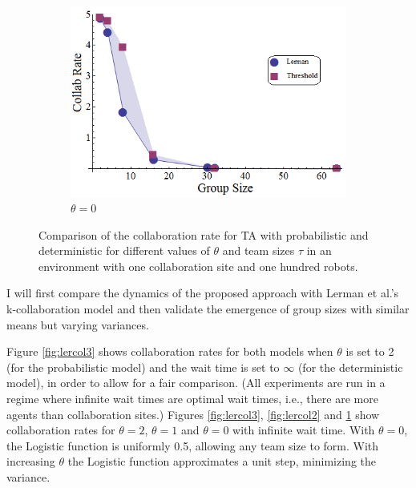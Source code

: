 \documentclass[defaultstyle,12pt]{thesis}
\begin{document}
\begin{figure}[!htb]
\begin{subfigure}{0.33\textwidth}
\centering\includegraphics[width=1.0\textwidth]{../assets/LermanCollabCompare1.png}
\centering\caption{$\theta=0$}\label{fig:lercol1}
\end{subfigure}
\caption{Comparison of the collaboration rate for TA with probabilistic and deterministic \cite{Lerman2001} for different values of $\theta$ and team sizes $\tau$ in an environment with one collaboration site and one hundred robots. }\label{fig:lercol}
\end{figure}

I will first compare the dynamics of the proposed approach with Lerman et al.'s k-collaboration model \cite{Lerman2001} and then validate the emergence of group sizes with similar means but varying variances.

Figure \ref{fig:lercol3} shows collaboration rates for both models when $\theta$ is set to 2 (for the probabilistic model) and the wait time is set to $\infty$ (for the deterministic model), in order to allow for a fair comparison. (All experiments are run in a regime where infinite wait times are optimal wait times, i.e., there are more agents than collaboration sites.) Figures \ref{fig:lercol3}, \ref{fig:lercol2} and \ref{fig:lercol1} show collaboration rates for $\theta = 2$, $\theta = 1$ and $\theta=0$ with infinite wait time. With $\theta=0$, the Logistic function is uniformly 0.5, allowing any team size to form.  
With increasing $\theta$ the Logistic function approximates a unit step, minimizing the variance. 
\end{document}
